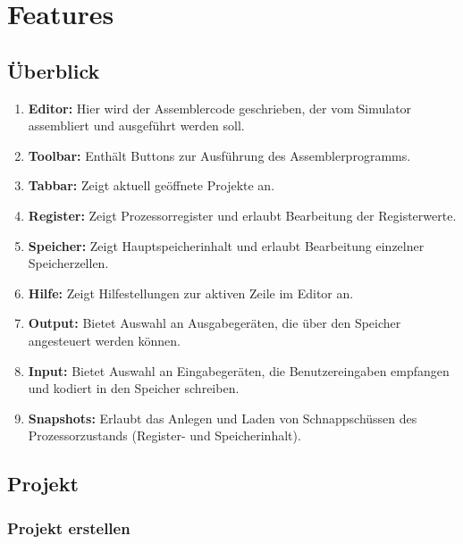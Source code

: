 
\section{Features}

\subsection*{Überblick}


\begin{enumerate}
\item \textbf{Editor:} Hier wird der Assemblercode geschrieben, der vom Simulator assembliert und ausgeführt werden soll.
\item \textbf{Toolbar:} Enthält Buttons zur Ausführung des Assemblerprogramms.
\item \textbf{Tabbar:} Zeigt aktuell geöffnete Projekte an.
\item \textbf{Register:} Zeigt Prozessorregister und erlaubt Bearbeitung der Registerwerte.
\item \textbf{Speicher:} Zeigt Hauptspeicherinhalt und erlaubt Bearbeitung einzelner Speicherzellen.
\item \textbf{Hilfe:} Zeigt Hilfestellungen zur aktiven Zeile im Editor an.
\item \textbf{Output:} Bietet Auswahl an Ausgabegeräten, die über den Speicher angesteuert werden können.
\item \textbf{Input:} Bietet Auswahl an Eingabegeräten, die Benutzereingaben empfangen und kodiert in den Speicher schreiben.
\item \textbf{Snapshots:} Erlaubt das Anlegen und Laden von Schnappschüssen des Prozessorzustands (Register- und Speicherinhalt).
\end{enumerate}


\subsection{Projekt}

\subsubsection{Projekt erstellen}
\label{sec:project_creation}

